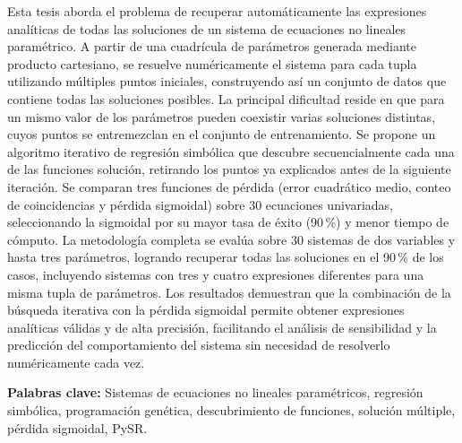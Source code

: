 \begin{resumen}
	Esta tesis aborda el problema de recuperar automáticamente las expresiones analíticas de todas las soluciones de un sistema de ecuaciones no lineales paramétrico. A partir de una cuadrícula de parámetros generada mediante producto cartesiano, se resuelve numéricamente el sistema para cada tupla utilizando múltiples puntos iniciales, construyendo así un conjunto de datos que contiene todas las soluciones posibles. La principal dificultad reside en que para un mismo valor de los parámetros pueden coexistir varias soluciones distintas, cuyos puntos se entremezclan en el conjunto de entrenamiento. Se propone un algoritmo iterativo de regresión simbólica que descubre secuencialmente cada una de las funciones solución, retirando los puntos ya explicados antes de la siguiente iteración. Se comparan tres funciones de pérdida (error cuadrático medio, conteo de coincidencias y pérdida sigmoidal) sobre 30 ecuaciones univariadas, seleccionando la sigmoidal por su mayor tasa de éxito (90\,\%) y menor tiempo de cómputo. La metodología completa se evalúa sobre 30 sistemas de dos variables y hasta tres parámetros, logrando recuperar todas las soluciones en el 90\,\% de los casos, incluyendo sistemas con tres y cuatro expresiones diferentes para una misma tupla de parámetros. Los resultados demuestran que la combinación de la búsqueda iterativa con la pérdida sigmoidal permite obtener expresiones analíticas válidas y de alta precisión, facilitando el análisis de sensibilidad y la predicción del comportamiento del sistema sin necesidad de resolverlo numéricamente cada vez.

	


	\textbf{Palabras clave:} Sistemas de ecuaciones no lineales paramétricos, regresión simbólica, programación genética, descubrimiento de funciones, solución múltiple, pérdida sigmoidal, PySR.
\end{resumen}

